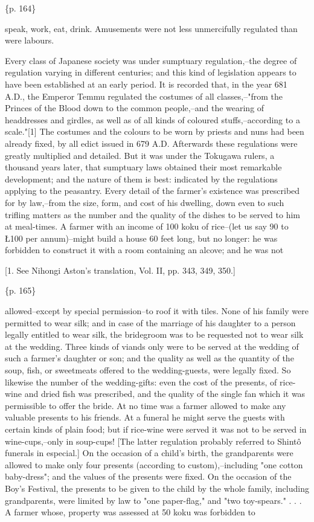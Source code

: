 \{p. 164\}

speak, work, eat, drink. Amusements were not less unmercifully regulated than were labours.

Every class of Japanese society was under sumptuary regulation,--the degree of regulation varying in different centuries; and this kind of legislation appears to have been established at an early period. It is recorded that, in the year 681 A.D., the Emperor Temmu regulated the costumes of all classes,--"from the Princes of the Blood down to the common people,--and the wearing of headdresses and girdles, as well as of all kinds of coloured stuffs,--according to a scale."[1] The costumes and the colours to be worn by priests and nuns had been already fixed, by all edict issued in 679 A.D. Afterwards these regulations were greatly multiplied and detailed. But it was under the Tokugawa rulers, a thousand years later, that sumptuary laws obtained their most remarkable development; and the nature of them is best: indicated by the regulations applying to the peasantry. Every detail of the farmer's existence was prescribed for by law,--from the size, form, and cost of his dwelling, down even to such trifling matters as the number and the quality of the dishes to be served to him at meal-times. A farmer with an income of 100 koku of rice--(let us say 90 to Ł100 per annum)--might build a house 60 feet long, but no longer: he was forbidden to construct it with a room containing an alcove; and he was not

[1. See Nihongi Aston's translation, Vol. II, pp. 343, 349, 350.]

\{p. 165\}

allowed--except by special permission--to roof it with tiles. None of his family were permitted to wear silk; and in case of the marriage of his daughter to a person legally entitled to wear silk, the bridegroom was to be requested not to wear silk at the wedding. Three kinds of viands only were to be served at the wedding of such a farmer's daughter or son; and the quality as well as the quantity of the soup, fish, or sweetmeats offered to the wedding-guests, were legally fixed. So likewise the number of the wedding-gifts: even the cost of the presents, of rice-wine and dried fish was prescribed, and the quality of the single fan which it was permissible to offer the bride. At no time was a farmer allowed to make any valuable presents to his friends. At a funeral he might serve the guests with certain kinds of plain food; but if rice-wine were served it was not to be served in wine-cups,--only in soup-cups! [The latter regulation probably referred to Shintô funerals in especial.] On the occasion of a child's birth, the grandparents were allowed to make only four presents (according to custom),--including "one cotton baby-dress"; and the values of the presents were fixed. On the occasion of the Boy's Festival, the presents to be given to the child by the whole family, including grandparents, were limited by law to "one paper-flag," and "two toy-spears." . . . A farmer whose, property was assessed at 50 koku was forbidden to

